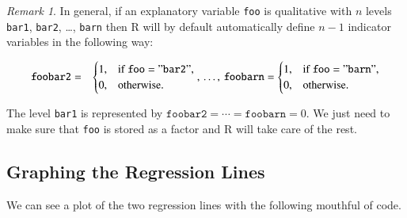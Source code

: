 \documentclass[]{book}
\newenvironment{Shaded}{\begin{snugshade}}{\end{snugshade}}
\newcommand{\KeywordTok}[1]{\textcolor[rgb]{0.13,0.29,0.53}{\textbf{{#1}}}}
\newcommand{\DataTypeTok}[1]{\textcolor[rgb]{0.13,0.29,0.53}{{#1}}}
\newcommand{\DecValTok}[1]{\textcolor[rgb]{0.00,0.00,0.81}{{#1}}}
\newcommand{\StringTok}[1]{\textcolor[rgb]{0.31,0.60,0.02}{{#1}}}
\newcommand{\NormalTok}[1]{{#1}}
\numberwithin{equation}{chapter}
\numberwithin{figure}{chapter}
\theoremstyle{plain}
\theoremstyle{definition}
\theoremstyle{remark}
\newtheorem{rem}[thm]{Remark}
\theoremstyle{definition}
\theoremstyle{definition}
\theoremstyle{remark}
\begin{document}
\bigskip

\begin{rem}
In general, if an explanatory variable \texttt{foo} is qualitative with
\(n\) levels \texttt{bar1}, \texttt{bar2}, \ldots{}, \texttt{barn} then
R will by default automatically define \(n-1\) indicator variables in
the following way:

\begin{eqnarray*} \mathtt{foobar2} & = & \begin{cases} 1, & \mbox{if }\mathtt{foo}=\mathtt{"bar2"},\\ 0, & \mbox{otherwise.}\end{cases},\,\ldots,\,\mathtt{foobarn}=\begin{cases} 1, & \mbox{if }\mathtt{foo}=\mathtt{"barn"},\\ 0, & \mbox{otherwise.}\end{cases} \end{eqnarray*}

The level \texttt{bar1} is represented by
\(\mathtt{foobar2}=\cdots=\mathtt{foobarn}=0\). We just need to make
sure that \texttt{foo} is stored as a factor and R will take care of the
rest.
\end{rem}

\subsection{Graphing the Regression
Lines}\label{graphing-the-regression-lines}

We can see a plot of the two regression lines with the following
mouthful of code.

\begin{Shaded}
\end{Shaded}
\end{document}
